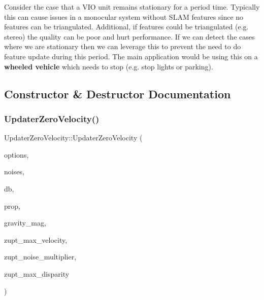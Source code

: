 Consider the case that a V\+IO unit remains stationary for a period time. Typically this can cause issues in a monocular system without S\+L\+AM features since no features can be triangulated. Additional, if features could be triangulated (e.\+g. stereo) the quality can be poor and hurt performance. If we can detect the cases where we are stationary then we can leverage this to prevent the need to do feature update during this period. The main application would be using this on a {\bfseries wheeled vehicle} which needs to stop (e.\+g. stop lights or parking). 

\subsection{Constructor \& Destructor Documentation}
\mbox{\label{classov__msckf_1_1UpdaterZeroVelocity_a1077d2767c078874ed48132ebaa9b975}} 
\subsubsection{\texorpdfstring{Updater\+Zero\+Velocity()}{UpdaterZeroVelocity()}}
{\footnotesize\ttfamily Updater\+Zero\+Velocity\+::\+Updater\+Zero\+Velocity (\begin{DoxyParamCaption}\item[{\hyperlink{structov__msckf_1_1UpdaterOptions}{Updater\+Options} \&}]{options,  }\item[{\hyperlink{structov__msckf_1_1NoiseManager}{Noise\+Manager} \&}]{noises,  }\item[{std\+::shared\+\_\+ptr$<$ \hyperlink{classov__core_1_1FeatureDatabase}{ov\+\_\+core\+::\+Feature\+Database} $>$}]{db,  }\item[{std\+::shared\+\_\+ptr$<$ \hyperlink{classov__msckf_1_1Propagator}{Propagator} $>$}]{prop,  }\item[{double}]{gravity\+\_\+mag,  }\item[{double}]{zupt\+\_\+max\+\_\+velocity,  }\item[{double}]{zupt\+\_\+noise\+\_\+multiplier,  }\item[{double}]{zupt\+\_\+max\+\_\+disparity }\end{DoxyParamCaption})}



